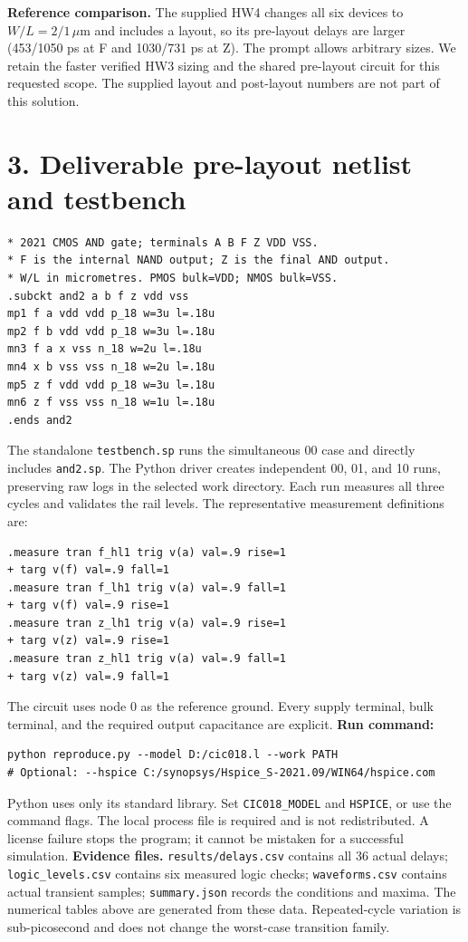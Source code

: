 \documentclass[11pt,a4paper]{article}
\begin{document}
\textbf{Reference comparison.} The supplied HW4 changes all six devices to $W/L=2/1\,\mu$m and includes a layout, so its pre-layout delays are larger (453/1050 ps at F and 1030/731 ps at Z). The prompt allows arbitrary sizes. We retain the faster verified HW3 sizing and the shared pre-layout circuit for this requested scope. The supplied layout and post-layout numbers are not part of this solution.
\newpage\section*{3. Deliverable pre-layout netlist and testbench}
\begin{lstlisting}
* 2021 CMOS AND gate; terminals A B F Z VDD VSS.
* F is the internal NAND output; Z is the final AND output.
* W/L in micrometres. PMOS bulk=VDD; NMOS bulk=VSS.
.subckt and2 a b f z vdd vss
mp1 f a vdd vdd p_18 w=3u l=.18u
mp2 f b vdd vdd p_18 w=3u l=.18u
mn3 f a x vss n_18 w=2u l=.18u
mn4 x b vss vss n_18 w=2u l=.18u
mp5 z f vdd vdd p_18 w=3u l=.18u
mn6 z f vss vss n_18 w=1u l=.18u
.ends and2
\end{lstlisting}

The standalone \texttt{testbench.sp} runs the simultaneous 00 case and directly includes \texttt{and2.sp}. The Python driver creates independent 00, 01, and 10 runs, preserving raw logs in the selected work directory. Each run measures all three cycles and validates the rail levels. The representative measurement definitions are:
\begin{lstlisting}
.measure tran f_hl1 trig v(a) val=.9 rise=1
+ targ v(f) val=.9 fall=1
.measure tran f_lh1 trig v(a) val=.9 fall=1
+ targ v(f) val=.9 rise=1
.measure tran z_lh1 trig v(a) val=.9 rise=1
+ targ v(z) val=.9 rise=1
.measure tran z_hl1 trig v(a) val=.9 fall=1
+ targ v(z) val=.9 fall=1
\end{lstlisting}
The circuit uses node 0 as the reference ground. Every supply terminal, bulk terminal, and the required output capacitance are explicit.
\textbf{Run command:}
\begin{lstlisting}
python reproduce.py --model D:/cic018.l --work PATH
# Optional: --hspice C:/synopsys/Hspice_S-2021.09/WIN64/hspice.com
\end{lstlisting}
Python uses only its standard library. Set \texttt{CIC018\_MODEL} and \texttt{HSPICE}, or use the command flags. The local process file is required and is not redistributed. A license failure stops the program; it cannot be mistaken for a successful simulation.
\textbf{Evidence files.} \texttt{results/delays.csv} contains all 36 actual delays; \texttt{logic\_levels.csv} contains six measured logic checks; \texttt{waveforms.csv} contains actual transient samples; \texttt{summary.json} records the conditions and maxima. The numerical tables above are generated from these data. Repeated-cycle variation is sub-picosecond and does not change the worst-case transition family.
\end{document}
